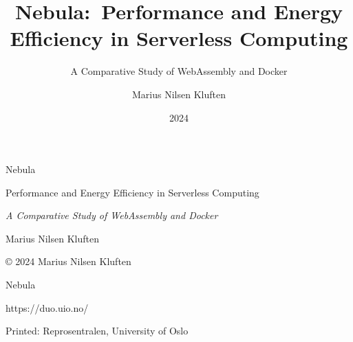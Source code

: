 \documentclass[
  table]{report}
\title{Nebula:~Performance and Energy Efficiency in Serverless
Computing}
\subtitle{A Comparative Study of WebAssembly and Docker}
\author{Marius Nilsen Kluften}
\date{2024}
\begin{document}
\maketitle

\uiomasterfp[compact, program={Informatics: Programming and System Architecture}, color=blue, image={assets/cover_v_1}]

\newpage

\begin{center}
\vspace*{\fill} 
{\LARGE\headingfont Nebula\par}
{\LARGE\headingfont Performance and Energy Efficiency in Serverless Computing\par}
{\Large\itshape\headingfont A Comparative Study of WebAssembly and Docker\par}
\vspace{2cm} 
\Large\headingfont Marius Nilsen Kluften \\[30pt]
\vspace*{\fill} 
\end{center}

\newpage

\null\vfill
\begin{flushleft}
\Large © 2024 Marius Nilsen Kluften\par
\Large Nebula \par
\Large https://duo.uio.no/ \par
\Large Printed: Reprosentralen, University of Oslo \par
\end{flushleft}

\newpage
\fancyfoot[C]{ \thepage\ }
\end{document}
